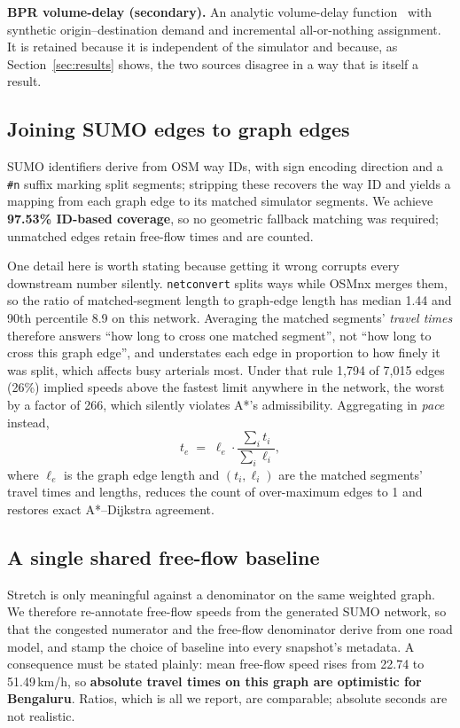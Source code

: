\textbf{BPR volume-delay (secondary).} An analytic volume-delay
function~\cite{bpr1964} with synthetic origin--destination demand and
incremental all-or-nothing assignment. It is retained because it is
independent of the simulator and because, as Section~\ref{sec:results}
shows, the two sources disagree in a way that is itself a result.

\subsection{Joining SUMO edges to graph edges}

SUMO identifiers derive from OSM way IDs, with sign encoding direction and a
\texttt{\#n} suffix marking split segments; stripping these recovers the way
ID and yields a mapping from each graph edge to its matched simulator
segments. We achieve \textbf{97.53\% ID-based coverage}, so no geometric
fallback matching was required; unmatched edges retain free-flow times and
are counted.

One detail here is worth stating because getting it wrong corrupts every
downstream number silently. \texttt{netconvert} splits ways while OSMnx
merges them, so the ratio of matched-segment length to graph-edge length has
median 1.44 and 90th percentile 8.9 on this network. Averaging the matched
segments' \emph{travel times} therefore answers ``how long to cross one
matched segment'', not ``how long to cross this graph edge'', and understates
each edge in proportion to how finely it was split, which affects busy arterials most. Under that rule 1{,}794 of 7{,}015 edges (26\%) implied
speeds above the fastest limit anywhere in the network, the worst by a factor
of 266, which silently violates A*'s admissibility. Aggregating in
\emph{pace} instead,
\begin{equation}
t_e \;=\; \ell_e \cdot \frac{\sum_i t_i}{\sum_i \ell_i},
\end{equation}
where $\ell_e$ is the graph edge length and $(t_i, \ell_i)$ are the matched
segments' travel times and lengths, reduces the count of over-maximum edges
to 1 and restores exact A*--Dijkstra agreement.

\subsection{A single shared free-flow baseline}

Stretch is only meaningful against a denominator on the same weighted graph.
We therefore re-annotate free-flow speeds from the generated SUMO network, so
that the congested numerator and the free-flow denominator derive from one
road model, and stamp the choice of baseline into every snapshot's metadata.
A consequence must be stated plainly: mean free-flow speed rises from
22.74 to 51.49\,km/h, so \textbf{absolute travel times on this graph are
optimistic for Bengaluru}. Ratios, which is all we report, are comparable; absolute seconds are not realistic.

